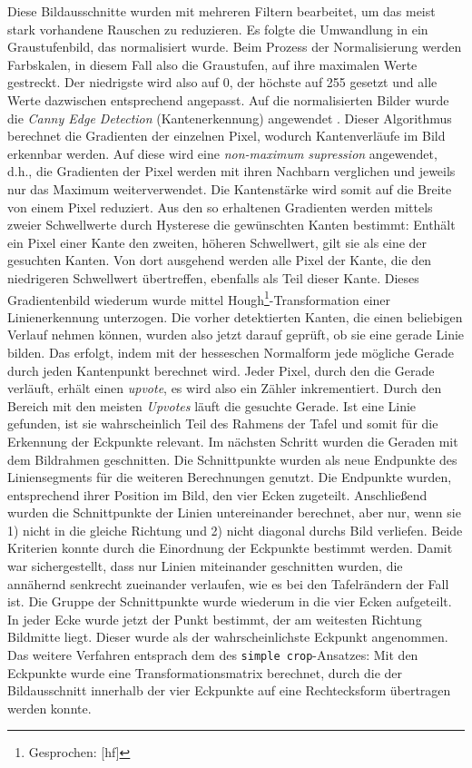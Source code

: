 Diese Bildausschnitte wurden mit mehreren Filtern bearbeitet, um das meist stark vorhandene Rauschen zu reduzieren. Es folgte die Umwandlung in ein Graustufenbild, das normalisiert wurde. Beim Prozess der Normalisierung werden Farbskalen, in diesem Fall also die Graustufen, auf ihre maximalen Werte gestreckt. Der niedrigste wird also auf 0, der höchste auf 255 gesetzt und alle Werte dazwischen entsprechend angepasst. Auf die normalisierten Bilder wurde die \textit{Canny Edge Detection} (Kantenerkennung) angewendet \cite{cannyedge}. Dieser Algorithmus berechnet die Gradienten der einzelnen Pixel, wodurch Kantenverläufe im Bild erkennbar werden. Auf diese wird eine \textit{non-maximum supression} angewendet, d.h., die Gradienten der Pixel werden mit ihren Nachbarn verglichen und jeweils nur das Maximum weiterverwendet. Die Kantenstärke wird somit auf die Breite von einem Pixel reduziert. Aus den so erhaltenen Gradienten werden mittels zweier Schwellwerte durch Hysterese die gewünschten Kanten bestimmt: Enthält ein Pixel einer Kante den zweiten, höheren Schwellwert, gilt sie als eine der gesuchten Kanten. Von dort ausgehend werden alle Pixel der Kante, die den niedrigeren Schwellwert übertreffen, ebenfalls als Teil dieser Kante.
Dieses Gradientenbild wiederum wurde mittel Hough\footnote{Gesprochen: [h\textturnv{}f]}-Transformation \cite{houghpatent} einer Linienerkennung unterzogen. Die vorher detektierten Kanten, die einen beliebigen Verlauf nehmen können, wurden also jetzt darauf geprüft, ob sie eine gerade Linie bilden. Das erfolgt, indem mit der hesseschen Normalform jede mögliche Gerade durch jeden Kantenpunkt berechnet wird. Jeder Pixel, durch den die Gerade verläuft, erhält einen \textit{upvote}, es wird also ein Zähler inkrementiert. Durch den Bereich mit den meisten \textit{Upvotes} läuft die gesuchte Gerade. Ist eine Linie gefunden, ist sie wahrscheinlich Teil des Rahmens der Tafel und somit für die Erkennung der Eckpunkte relevant.
Im nächsten Schritt wurden die Geraden mit dem Bildrahmen geschnitten. Die Schnittpunkte wurden als neue Endpunkte des Liniensegments für die weiteren Berechnungen genutzt. Die Endpunkte wurden, entsprechend ihrer Position im Bild, den vier Ecken zugeteilt. Anschließend wurden die Schnittpunkte der Linien untereinander berechnet, aber nur, wenn sie 1) nicht in die gleiche Richtung und 2) nicht diagonal durchs Bild verliefen. Beide Kriterien konnte durch die Einordnung der Eckpunkte bestimmt werden. Damit war sichergestellt, dass nur Linien miteinander geschnitten wurden, die annähernd senkrecht zueinander verlaufen, wie es bei den Tafelrändern der Fall ist.
Die Gruppe der Schnittpunkte wurde wiederum in die vier Ecken aufgeteilt. In jeder Ecke wurde jetzt der Punkt bestimmt, der am weitesten Richtung Bildmitte liegt. Dieser wurde als der wahrscheinlichste Eckpunkt angenommen.
Das weitere Verfahren entsprach dem des \verb|simple crop|-Ansatzes: Mit den Eckpunkte wurde eine Transformationsmatrix berechnet, durch die der Bildausschnitt innerhalb der vier Eckpunkte auf eine Rechtecksform übertragen werden konnte.



